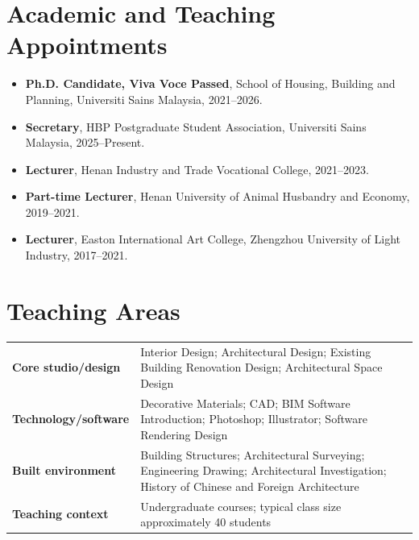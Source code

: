 \documentclass[10pt,a4paper]{article}
\begin{document}
\section*{Academic and Teaching Appointments}
\begin{itemize}
  \item \textbf{Ph.D. Candidate, Viva Voce Passed}, School of Housing, Building and Planning, Universiti Sains Malaysia, 2021--2026.
  \item \textbf{Secretary}, HBP Postgraduate Student Association, Universiti Sains Malaysia, 2025--Present.
  \item \textbf{Lecturer}, Henan Industry and Trade Vocational College, 2021--2023.
  \item \textbf{Part-time Lecturer}, Henan University of Animal Husbandry and Economy, 2019--2021.
  \item \textbf{Lecturer}, Easton International Art College, Zhengzhou University of Light Industry, 2017--2021.
\end{itemize}

\section*{Teaching Areas}
\begin{tabularx}{\textwidth}{>{\bfseries}p{}X}
Core studio/design & Interior Design; Architectural Design; Existing Building Renovation Design; Architectural Space Design \\
Technology/software & Decorative Materials; CAD; BIM Software Introduction; Photoshop; Illustrator; Software Rendering Design \\
Built environment & Building Structures; Architectural Surveying; Engineering Drawing; Architectural Investigation; History of Chinese and Foreign Architecture \\
Teaching context & Undergraduate courses; typical class size approximately 40 students \\
\end{tabularx}
\end{document}
